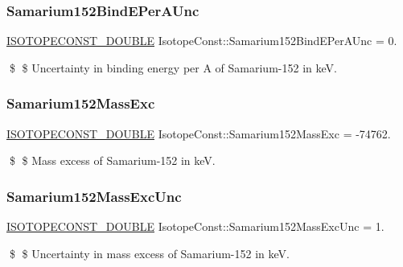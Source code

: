 \subsubsection{\texorpdfstring{Samarium152\+Bind\+E\+Per\+A\+Unc}{Samarium152BindEPerAUnc}}
{\footnotesize\ttfamily \mbox{\hyperlink{group___isotope_const-_macros_ga8f45a7272ce02c0b4c65c44636ed719a}{I\+S\+O\+T\+O\+P\+E\+C\+O\+N\+S\+T\+\_\+\+D\+O\+U\+B\+LE}} Isotope\+Const\+::\+Samarium152\+Bind\+E\+Per\+A\+Unc = 0.}

\$ \$ Uncertainty in binding energy per A of Samarium-\/152 in keV. \mbox{\label{group___isotope_const-_samarium-_sm152_gae08c3ca489730b5144803efdefeea878}} 
\subsubsection{\texorpdfstring{Samarium152\+Mass\+Exc}{Samarium152MassExc}}
{\footnotesize\ttfamily \mbox{\hyperlink{group___isotope_const-_macros_ga8f45a7272ce02c0b4c65c44636ed719a}{I\+S\+O\+T\+O\+P\+E\+C\+O\+N\+S\+T\+\_\+\+D\+O\+U\+B\+LE}} Isotope\+Const\+::\+Samarium152\+Mass\+Exc = -\/74762.}

\$ \$ Mass excess of Samarium-\/152 in keV. \mbox{\label{group___isotope_const-_samarium-_sm152_gafd638d841069b7efb8a5754932ca83ea}} 
\subsubsection{\texorpdfstring{Samarium152\+Mass\+Exc\+Unc}{Samarium152MassExcUnc}}
{\footnotesize\ttfamily \mbox{\hyperlink{group___isotope_const-_macros_ga8f45a7272ce02c0b4c65c44636ed719a}{I\+S\+O\+T\+O\+P\+E\+C\+O\+N\+S\+T\+\_\+\+D\+O\+U\+B\+LE}} Isotope\+Const\+::\+Samarium152\+Mass\+Exc\+Unc = 1.}

\$ \$ Uncertainty in mass excess of Samarium-\/152 in keV. \mbox{\label{group___isotope_const-_samarium-_sm152_ga1a0c7364d981962072791a421d4b59e8}} 

